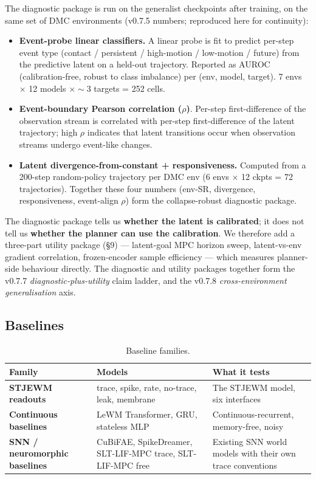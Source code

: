 \documentclass{article}
\begin{document}
The diagnostic package is run on the generalist checkpoints after training, on the same set of DMC environments (v0.7.5 numbers; reproduced here for continuity):

\begin{itemize}
\item \textbf{Event-probe linear classifiers.} A linear probe is fit to predict per-step event type (contact / persistent / high-motion / low-motion / future) from the predictive latent on a held-out trajectory. Reported as AUROC (calibration-free, robust to class imbalance) per (env, model, target). 7 envs $\times$ 12 models $\times \sim$3 targets = 252 cells.
\item \textbf{Event-boundary Pearson correlation ($\rho$)}. Per-step first-difference of the observation stream is correlated with per-step first-difference of the latent trajectory; high $\rho$ indicates that latent transitions occur when observation streams undergo event-like changes.
\item \textbf{Latent divergence-from-constant + responsiveness.} Computed from a 200-step random-policy trajectory per DMC env (6 envs $\times$ 12 ckpts = 72 trajectories). Together these four numbers (env-SR, divergence, responsiveness, event-align $\rho$) form the collapse-robust diagnostic package.
\end{itemize}

The diagnostic package tells us \textbf{whether the latent is calibrated}; it does not tell us \textbf{whether the planner can use the calibration}. We therefore add a three-part utility package (§9) --- latent-goal MPC horizon sweep, latent-vs-env gradient correlation, frozen-encoder sample efficiency --- which measures planner-side behaviour directly. The diagnostic and utility packages together form the v0.7.7 \emph{diagnostic-plus-utility} claim ladder, and the v0.7.8 \emph{cross-environment generalisation} axis.

\subsection{Baselines}

\begin{table}[ht]
\centering
\small
\begin{tabular}{lll}
\toprule
Family & Models & What it tests \\
\midrule
\textbf{STJEWM readouts} & trace, spike, rate, no-trace, leak, membrane & The STJEWM model, six interfaces \\
\textbf{Continuous baselines} & LeWM Transformer, GRU, stateless MLP & Continuous-recurrent, memory-free, noisy \\
\textbf{SNN / neuromorphic baselines} & CuBiFAE, SpikeDreamer, SLT-LIF-MPC trace, SLT-LIF-MPC free & Existing SNN world models with their own trace conventions \\
\bottomrule
\end{tabular}
\caption{Baseline families.}
\label{tab:baselines}
\end{table}
\end{document}
